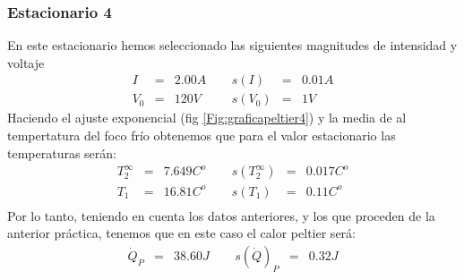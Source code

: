 \documentclass[12pt,a4paper]{article}
\begin{document}
\subsubsection{Estacionario 4}
En este estacionario hemos seleccionado las siguientes magnitudes de intensidad y voltaje  
\begin{equation} 
\begin{array}{lllllll}
I & = & 2.00 A & \ \ & s(I) & = & 0.01  A \\ 
 V_0 & = & 120 V & \ \ & s(V_0) & = & 1 V
\end{array} 
\end{equation} 
 Haciendo el ajuste exponencial (fig \ref{Fig:graficapeltier4}) y la media de al tempertatura del foco frío obtenemos que para el valor estacionario las temperaturas serán: 
\begin{equation} 
\begin{array}{lllllll}
T_2^{\infty} & = & 7.649 C^o &  \ \ &  s(T_2^{\infty}) & =  & 0.017  C^o \\ 
 T_1 & = & 16.81  C^o & \ \ & s(T_1) & = & 0.11  C^o \\ 
 \end{array} 
\end{equation} 
 Por lo tanto, teniendo en cuenta los datos anteriores, y los que proceden de la anterior práctica, tenemos que en este caso el calor peltier será: 
\begin{equation} 
\begin{array}{lllllll}
\dot{Q}_P & = & 38.60 J & \ \ & s(\dot{Q})_P & = & 0.32 J \\ 
\end{array} 
\end{equation} 
 
 
 
 
\end{document}
